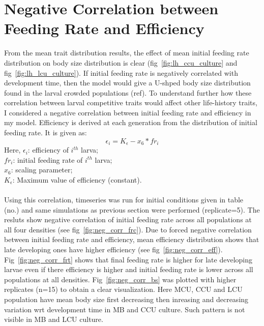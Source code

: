 \section{Negative Correlation between Feeding Rate and Efficiency}
From the mean trait distribution results, the effect of mean initial feeding rate distribution on body size distribution is clear (fig~\ref{fig:lh_ccu_culture} and fig~\ref{fig:lh_lcu_culture}). If initial feeding rate is negatively correlated with development time, then the model would give a U-shped body size distribution found in the larval crowded populations (ref). To understand further how these correlation between larval competitive traits would affect other life-history traits, I considered a negative correlation between initial feeding rate and efficiency in my model. Efficiency is derived at each generation from the distribution of initial feeding rate. It is given as:
\[\epsilon_{i} = K_{\epsilon} - x_{6}*fr_{i}\]
Here,
$\epsilon_{i}$: efficiency of $i^{th}$ larva;\\
$fr_{i}$: initial feeding rate of $i^{th}$ larva;\\
$x_{6}$: scaling parameter;\\
$K_{\epsilon}$: Maximum value of efficiency (constant).\\\\
Using this correlation, timeseries was run for initial conditions given in table (no.) and same simulations as previous section were performed (replicate=5). The resluts show negative correlation of initial feeding rate across all populations at all four densities (see fig~\ref{fig:neg_corr_frc}). Due to forced negative correlation between initial feeding rate and efficiency, mean efficiency distribution shows that late developing ones have higher efficiency (see fig~\ref{fig:neg_corr_eff}). Fig~\ref{fig:neg_corr_frt} shows that final feeding rate is higher for late developing larvae even if there efficiency is higher and initial feeding rate is lower across all populations at all densities. Fig~\ref{fig:neg_corr_bs} was plotted with higher replicates (n=15) to obtain a clear visualization. Here MCU, CCU and LCU population have mean body size first decreasing then inreasing and decreasing variation wrt development time in MB and CCU culture. Such pattern is not visible in MB and LCU culture.

